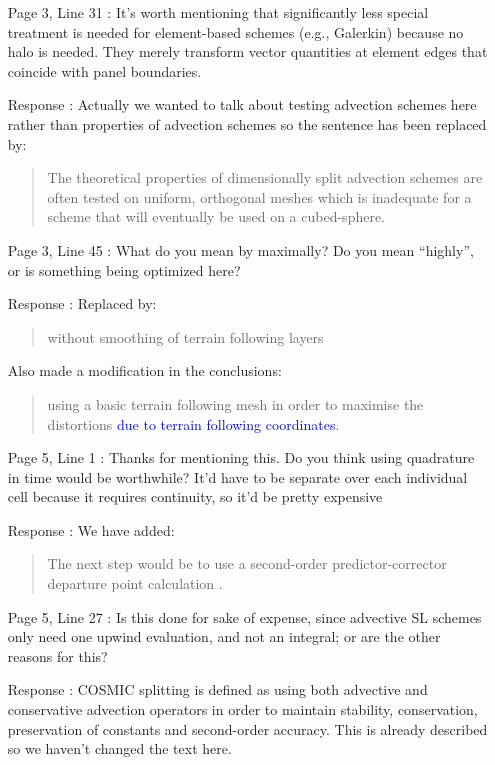 \documentclass[12pt]{article}
\begin{document}
\begin{enumerate}
\item [Page 3, Line 31]: It's worth mentioning that significantly less special treatment is needed for element-based schemes (e.g., Galerkin) because no halo is needed. They merely transform vector quantities at element edges that coincide with panel boundaries.

\item [Response]: Actually we wanted to talk about testing advection schemes here rather than properties of advection schemes so the sentence has been replaced by:
\begin{quote}
The theoretical properties of dimensionally split advection schemes are often tested on uniform, orthogonal meshes \cite[eg][]{LLM96} which is inadequate for a scheme that will eventually be used on a cubed-sphere.
\end{quote}

\item [Page 3, Line 45]: What do you mean by maximally? Do you mean ``highly'', or is something being optimized here?

\item [Response]: Replaced by:
\begin{quote}
without smoothing of terrain following layers
\end{quote}
Also made a modification in the conclusions:
\begin{quote}
using a basic terrain following mesh in order to maximise the distortions \textcolor{blue}{due to terrain following coordinates}.
\end{quote}

\item [Page 5, Line 1]: Thanks for mentioning this. Do you think using quadrature in time would be worthwhile? It'd have to be separate over each individual cell because it requires continuity, so it'd be pretty expensive

\item [Response]: We have added:
\begin{quote}
The next step would be to use a second-order predictor-corrector departure point calculation \cite[eg][]{MDW+10}.
\end{quote}

\item [Page 5, Line 27]: Is this done for sake of expense, since advective SL schemes only need one upwind evaluation, and not an integral; or are the other reasons for this?

\item [Response]: COSMIC splitting is defined as using both advective and conservative advection operators in order to maintain stability, conservation, preservation of constants and second-order accuracy. This is already described so we haven't changed the text here.


\end{enumerate}
\end{document}
